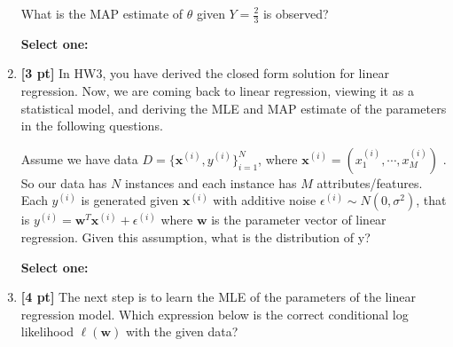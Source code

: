 \documentclass[12pt]{article}
\renewcommand{\circle}{\tikz\draw[black] (0,0) circle (1ex);}
\begin{document}
\begin{enumerate}
    What is the MAP estimate of $\theta$ given $Y=\frac{2}{3}$ is observed?

    \textbf{Select one:}
    
    
    \clearpage
    
    \item \textbf{[3 pt]} In HW3, you have derived the closed form solution for linear regression. Now, we are coming back to linear regression, viewing it as a statistical model, and deriving the MLE and MAP estimate of the parameters in the following questions. 
    
    Assume we have data $D = \{\mathbf{x}^{(i)}, y^{(i)}\}_{i=1}^{N}$, where $\mathbf{x}^{(i)} = (x_1^{(i)}, \cdots, x_M^{(i)})$ . So our data has $N$  instances and each instance has $M$  attributes/features. Each $y^{(i)}$ is generated given $\mathbf{x}^{(i)}$ with additive noise $\epsilon^{(i)} \sim N(0, \sigma^2)$, that is $y^{(i)} = \mathbf{w}^T \mathbf{x}^{(i)} + \epsilon^{(i)}$ where $\mathbf{w}$  is the parameter vector of linear regression. Given this assumption, what is the distribution of y? 

    \textbf{Select one:}
    
    
    \item \textbf{[4 pt]} The next step is to learn the MLE of the parameters of the linear regression model. Which expression below is the correct conditional log likelihood $\ell(\mathbf{w})$ with the given data?


\end{enumerate}
\end{document}
